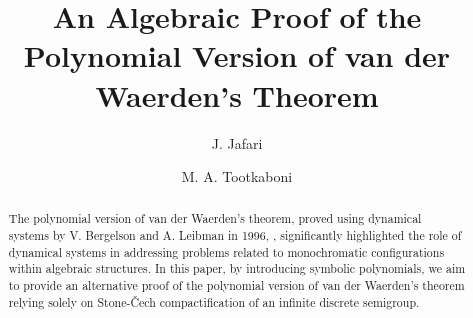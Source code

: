\documentclass{amsart}
\theoremstyle{definition}
\theoremstyle{remark}
\numberwithin{equation}{section}
\begin{document}
\title[]{An Algebraic Proof of the Polynomial Version of van der Waerden's Theorem}
\author{ J. Jafari}

\author{M. A. Tootkaboni }






\begin{abstract}
The polynomial version of van der Waerden's theorem, proved using dynamical systems by V. Bergelson and A. Leibman in 1996, \cite{Bergelson1996}, significantly highlighted the role of dynamical systems in addressing problems related to monochromatic configurations within algebraic structures. In this paper, by introducing symbolic polynomials, we aim to provide an alternative proof of the polynomial version of van der Waerden's theorem relying solely on Stone-\v{C}ech compactification of an infinite discrete semigroup.
\end{abstract}

\maketitle

\end{document}
